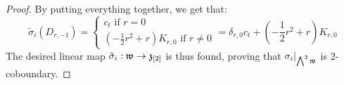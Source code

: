 \begin{proof}
                By putting everything together, we get that:
                    $$
                        \tilde{\sigma}_i(D_{r, -1}) =
                        \begin{cases}
                            \text{$c_t$ if $r = 0$}
                            \\
                            \text{$\left( -\frac12 r^2 + r \right) K_{r, 0}$ if $r \not = 0$}
                        \end{cases}
                        = \delta_{r, 0} c_t + \left( -\frac12 r^2 + r \right) K_{r, 0}
                    $$
                The desired linear map $\tilde{\sigma}_i: \mathfrak{w} \to \mathfrak{z}_{[2]}$ is thus found, proving that $\sigma_i|_{ \bigwedge^2 \mathfrak{w} }$ is $2$-coboundary. 
            \end{proof}

